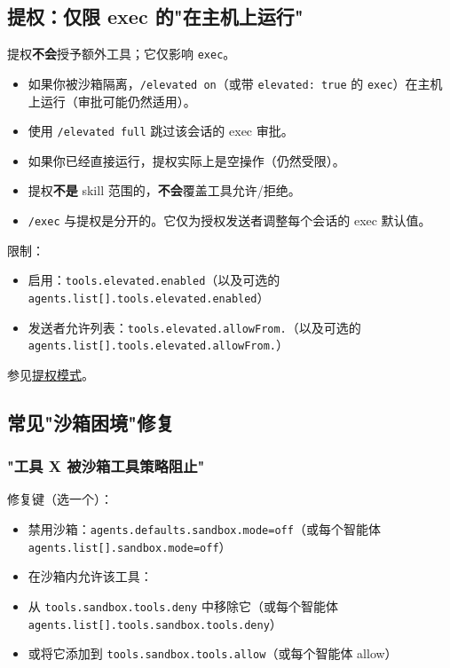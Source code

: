 \subsection{提权：仅限 exec 的"在主机上运行"}


提权\textbf{不会}授予额外工具；它仅影响 \texttt{exec}。

\begin{itemize}
  \item 如果你被沙箱隔离，\texttt{/elevated on}（或带 \texttt{elevated: true} 的 \texttt{exec}）在主机上运行（审批可能仍然适用）。
  \item 使用 \texttt{/elevated full} 跳过该会话的 exec 审批。
  \item 如果你已经直接运行，提权实际上是空操作（仍然受限）。
  \item 提权\textbf{不是} skill 范围的，\textbf{不会}覆盖工具允许/拒绝。
  \item \texttt{/exec} 与提权是分开的。它仅为授权发送者调整每个会话的 exec 默认值。
\end{itemize}


限制：

\begin{itemize}
  \item 启用：\texttt{tools.elevated.enabled}（以及可选的 \texttt{agents.list[].tools.elevated.enabled}）
  \item 发送者允许列表：\texttt{tools.elevated.allowFrom.}（以及可选的 \texttt{agents.list[].tools.elevated.allowFrom.}）
\end{itemize}


参见\href{/tools/elevated}{提权模式}。

\subsection{常见"沙箱困境"修复}


\subsubsection{"工具 X 被沙箱工具策略阻止"}


修复键（选一个）：

\begin{itemize}
  \item 禁用沙箱：\texttt{agents.defaults.sandbox.mode=off}（或每个智能体 \texttt{agents.list[].sandbox.mode=off}）
  \item 在沙箱内允许该工具：
  \item 从 \texttt{tools.sandbox.tools.deny} 中移除它（或每个智能体 \texttt{agents.list[].tools.sandbox.tools.deny}）
  \item 或将它添加到 \texttt{tools.sandbox.tools.allow}（或每个智能体 allow）
\end{itemize}


